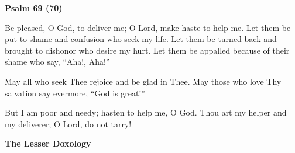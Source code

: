 \newpage
\begin{center}
\textbf{Psalm 69 (70)}
\end{center}

\begin{hang}
\noindent\makebox[\indt][l]{}Be pleased, O God, to deliver me; O Lord, make 
haste to help me.  Let them be put to shame and confusion who seek my life.  
Let them be turned back and brought to dishonor who desire my hurt.  Let them 
be appalled because of their shame who say, ``Aha!, Aha!''

May all who seek Thee rejoice and be glad in Thee.  May those who love Thy 
salvation say evermore, ``God is great!''

But I am poor and needy; hasten to help me, O God.  Thou art my helper and my 
deliverer; O Lord, do not tarry!

\end{hang}

\begin{center}
\textbf{The Lesser Doxology}
\end{center}

